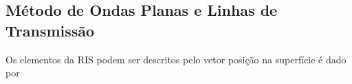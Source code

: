 \documentclass[
	12pt,				%
	openright,			%
	oneside,			%
	a4paper,			%
	english,			%
	brazil				%
	]{abntex2}
\begin{document}
%
%


\begin{apendicesenv}


\chapter{Método de Ondas Planas e Linhas de Transmissão }

Os elementos da RIS podem ser descritos pelo vetor posição na superfície é dado por


\end{apendicesenv}
\end{document}
